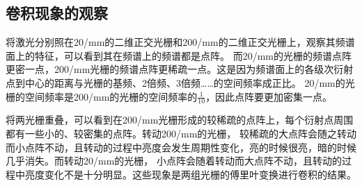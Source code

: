 \documentclass{article}
\begin{document}
    \subsection{卷积现象的观察}
    将激光分别照在20/mm的二维正交光栅和200/mm的二维正交光栅上，观察其频谱面上的特征，可以看到其在频谱上的频谱都是点阵。
    而20/mm的光栅的频谱点阵更密一点，200/mm光栅的频谱点阵更稀疏一点。这是因为频谱面上的各级次衍射点到中心的距离与光栅的基频、2倍频、3倍频……的空间频率成正比。
    20/mm的光栅的空间频率是200/mm的光栅的空间频率的$\frac{1}{10}$，因此点阵要更加密集一点。

    将两光栅重叠，可以看到在200/mm光栅形成的较稀疏的点阵上，每个衍射点周围都有一些小的、较密集的点阵。转动200/mm的光栅，
    较稀疏的大点阵会随之转动而小点阵不动，且转动的过程中亮度会发生周期性变化，亮的时候很亮，暗的时候几乎消失。而转动20/mm的光栅，
    小点阵会随着转动而大点阵不动，且转动的过程中亮度变化不是十分明显。这些现象是两组光栅的傅里叶变换进行卷积的结果。
\end{document}
